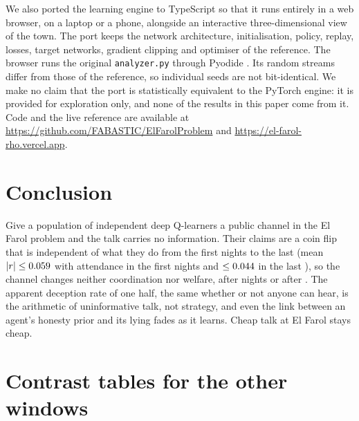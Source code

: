 \documentclass[11pt]{article}
\begin{document}
We also ported the learning engine to TypeScript so that it runs entirely in a web browser, on a laptop or a phone, alongside an interactive three-dimensional view of the town. The port keeps the network architecture, initialisation, policy, replay, losses, target networks, gradient clipping and optimiser of the reference. The browser runs the original \texttt{analyzer.py} through Pyodide \citep{pyodide}. Its random streams differ from those of the reference, so individual seeds are not bit-identical. We make no claim that the port is statistically equivalent to the PyTorch engine: it is provided for exploration only, and none of the results in this paper come from it. Code and the live reference are available at \url{https://github.com/FABASTIC/ElFarolProblem} and \url{https://el-farol-rho.vercel.app}.

\section{Conclusion}

Give a population of independent deep Q-learners a public channel in the El Farol problem and the talk carries no information. Their claims are a coin flip that is independent of what they do from the first nights to the last (mean $|r| \le 0.059$ with attendance in the first \rnightsShort{} nights and $\le 0.044$ in the last \rnightsLate), so the channel changes neither coordination nor welfare, after \rnightsShort{} nights or after \rnightsLong. The apparent deception rate of one half, the same whether or not anyone can hear, is the arithmetic of uninformative talk, not strategy, and even the link between an agent's honesty prior and its lying fades as it learns. Cheap talk at El Farol stays cheap.




\appendix

\section{Contrast tables for the other windows}\label{app:tables}

\begin{table}[htbp]
  \centering
  \small
  \setlength{\tabcolsep}{3pt}
  \caption{As Table~\ref{tab:contrast}, over all \rnightsLong{} nights. $q$ is computed over the \rnTestsLong{} contrasts in this window.}
  \label{tab:contrast-long}
\end{table}
\end{document}
